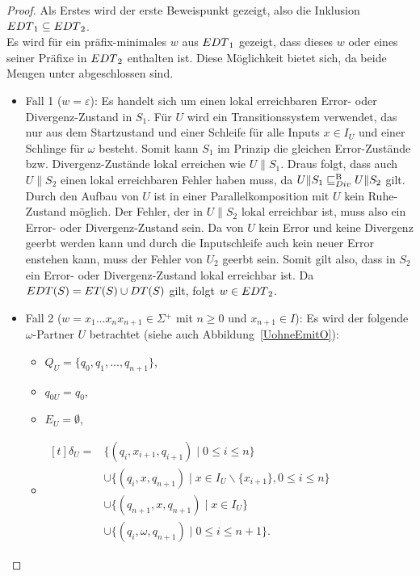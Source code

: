 \begin{proof}
  Als Erstes wird der erste Beweispunkt gezeigt, also die Inklusion
  $EDT{}_1\subseteq EDT{}_2$.\\
  Es wird für ein präfix-minimales $w$ aus $EDT{}_1$ gezeigt, dass dieses
  $w$ oder eines seiner Präfixe in $EDT{}_2$ enthalten ist. Diese Möglichkeit
  bietet sich, da beide Mengen unter \cont{} abgeschlossen sind.
  \begin{itemize}
    \item Fall 1 ($w=\varepsilon$): Es handelt sich um einen lokal erreichbaren
      Error- oder Divergenz-Zustand in $S_1$. Für $U$ wird ein Transitionssystem
      verwendet, das nur aus dem Startzustand und einer Schleife für alle
      Inputs $x\in I_U$ und einer Schlinge für $\omega$ besteht. Somit kann
      $S_1$ im Prinzip die gleichen Error-Zustände bzw. Divergenz-Zustände
      lokal erreichen wie $U\|S_1$. Draus folgt, dass auch $U\|S_2$ einen lokal
      erreichbaren Fehler haben muss, da $U\|S_1\sqsubseteq _{Div}^\mathrm{B} U\|S_2$ gilt. Durch den
      Aufbau von $U$ ist in einer Parallelkomposition mit $U$ kein
      Ruhe-Zustand möglich. Der Fehler, der in $U\|S_2$ lokal erreichbar ist,
      muss also ein Error- oder Divergenz-Zustand sein. Da von $U$ kein Error
      und keine Divergenz geerbt werden kann und durch die Inputschleife auch
      kein neuer Error enstehen kann, muss der Fehler von $U_2$ geerbt sein.
      Somit gilt also, dass in $S_2$ ein Error- oder Divergenz-Zustand lokal
      erreichbar ist. Da $EDT{}(S) = ET{}(S)\cup DT{}(S)$ gilt, folgt
      $w\in EDT{}_2$.
    \item Fall 2 ($w=x_1\dots x_nx_{n+1}\in\Sigma{} ^+$ mit $n\geq 0$ und
      $x_{n+1}\in I$): Es wird der folgende $\omega$-Partner $U$ betrachtet
      (siehe auch Abbildung~\ref{UohneEmitO}):
      \begin{itemize}
        \item $Q_U=\{q_0,q_1,\dots ,q_{n+1}\}$,
        \item $q_{0U}=q_0$,
        \item $E_U=\emptyset$,
        \item $\begin{aligned}[t]
            \delta _U=&\{(q_i,x_{i+1},q_{i+1})\mid  0\leq i\leq n\}\\
                      &\cup\{(q_i,x,q_{n+1})\mid  x\in I_U\backslash\{x_{i+1}\},
          0\leq i\leq n\}\\
          &\cup\{(q_{n+1},x,q_{n+1})\mid  x\in I_U\}\\
          &\cup\{(q_i,\omega ,q_{n+1})\mid 0\leq i\leq n+1\}.
        \end{aligned}$
      \end{itemize}
      \begin{figure} [h!tbp]
      \begin{center}
\end{center}
\end{figure}
\end{itemize}
\end{proof}
